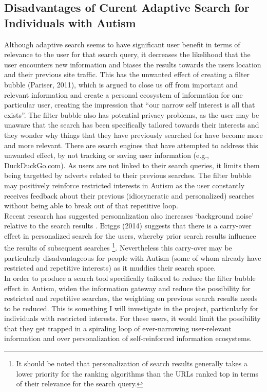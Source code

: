 \documentclass[10pt]{article}
\begin{document}
\subsection{Disadvantages of Curent Adaptive Search for Individuals with Autism}
Although adaptive search seems to have significant user benefit in terms of relevance to the user for that search query, it decreases the likelihood that the user encounters new information and biases the results towards the users location and their previous site traffic.  This has the unwanted effect of creating a filter bubble (Pariser, 2011), which is argued to close us off from important and relevant information and create a personal ecosystem of information for one particular user, creating the impression that “our narrow self interest is all that exists”. The filter bubble also has potential privacy problems, as the user may be unaware that the search has been specifically tailored towards their interests and they wonder why things that they have previously searched for have become more and more relevant. There are search engines that have attempted to address this unwanted effect, by not tracking or saving user information (e.g., DuckDuckGo.com). As users are not linked to their search queries, it limits them being targetted by adverts related to their previous searches. The filter bubble may positively reinforce restricted interests in Autism as the user constantly receives feedback about their previous (idiosyncratic and personalized) searches without being able to break out of that repetitive loop. \\Recent research has suggested personalization also increases ‘background noise’ relative to the search results \cite{briggs}. Briggs (2014) suggests that there is a carry-over effect in personalized search for the users, whereby prior search results influence the results of subsequent searches \footnote{It should be noted that personalization of search results generally takes a lower priority for the ranking algorithms than the URLs ranked top in terms of their relevance for the search query.}.  Nevertheless this carry-over may be particularly disadvantageous for people with Autism (some of whom already have restricted and repetitive interests) as it muddies their search space.\\
In order to produce a search tool specifically tailored to reduce the filter bubble effect in Autism, widen the information gateway and reduce the possibility for restricted and repetitive searches, the weighting on previous search results needs to be reduced. This is something I will investigate in the project, particularly for individuals with restricted interests. For these users, it would limit the possibility that they get trapped in a spiraling loop of ever-narrowing user-relevant information and over personalization of self-reinforced information ecosystems.
\end{document}
